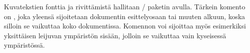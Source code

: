 \begin{koodilohkosis}
\end{koodilohkosis}

Kuvatekstien fonttia ja rivittämistä hallitaan \-/
paketin avulla. Tärkein komento on
, joka yleensä sijoitetaan dokumentin
esittelyosaan tai muuten alkuun, koska silloin se vaikuttaa koko
dokumentissa. Komennon voi sijoittaa myös esimerkiksi yksittäisen
leijuvan ympäristön sisään, jolloin se vaikuttaa vain kyseisessä
ympäristössä.

\begin{koodilohkosis}
\captionsetup[tyyppi]{valitsimet}
\end{koodilohkosis}


